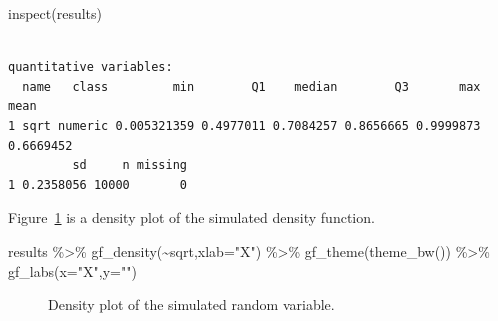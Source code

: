\documentclass[
  letterpaper,
  DIV=11,
  numbers=noendperiod]{scrreprt}
\newenvironment{Shaded}{\begin{snugshade}}{\end{snugshade}}
\newcommand{\AttributeTok}[1]{\textcolor[rgb]{0.40,0.45,0.13}{#1}}
\newcommand{\FunctionTok}[1]{\textcolor[rgb]{0.28,0.35,0.67}{#1}}
\newcommand{\NormalTok}[1]{\textcolor[rgb]{0.00,0.23,0.31}{#1}}
\newcommand{\SpecialCharTok}[1]{\textcolor[rgb]{0.37,0.37,0.37}{#1}}
\newcommand{\StringTok}[1]{\textcolor[rgb]{0.13,0.47,0.30}{#1}}
\begin{document}
\pagebreak

\begin{Shaded}
\begin{Highlighting}[]
\FunctionTok{inspect}\NormalTok{(results)}
\end{Highlighting}
\end{Shaded}

\begin{verbatim}

quantitative variables:  
  name   class         min        Q1    median        Q3       max      mean
1 sqrt numeric 0.005321359 0.4977011 0.7084257 0.8656665 0.9999873 0.6669452
         sd     n missing
1 0.2358056 10000       0
\end{verbatim}

\pagebreak

Figure~\ref{fig-plot116} is a density plot of the simulated density
function.

\begin{Shaded}
\begin{Highlighting}[]
\NormalTok{results }\SpecialCharTok{\%\textgreater{}\%}
  \FunctionTok{gf\_density}\NormalTok{(}\SpecialCharTok{\textasciitilde{}}\NormalTok{sqrt,}\AttributeTok{xlab=}\StringTok{"X"}\NormalTok{) }\SpecialCharTok{\%\textgreater{}\%}
  \FunctionTok{gf\_theme}\NormalTok{(}\FunctionTok{theme\_bw}\NormalTok{()) }\SpecialCharTok{\%\textgreater{}\%}
  \FunctionTok{gf\_labs}\NormalTok{(}\AttributeTok{x=}\StringTok{"X"}\NormalTok{,}\AttributeTok{y=}\StringTok{""}\NormalTok{)}
\end{Highlighting}
\end{Shaded}

\begin{figure}[H]


\caption{\label{fig-plot116}Density plot of the simulated random
variable.}

\end{figure}%
\end{document}
